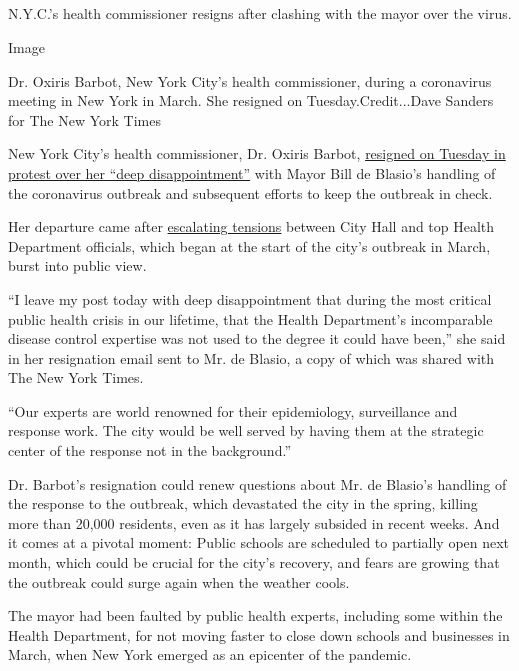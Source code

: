 \hypertarget{-1}{%
\subsection{}\label{-1}}

N.Y.C.'s health commissioner resigns after clashing with the mayor over
the virus.

Image

Dr. Oxiris Barbot, New York City's health commissioner, during a
coronavirus meeting in New York in March. She resigned on
Tuesday.Credit...Dave Sanders for The New York Times

New York City's health commissioner, Dr. Oxiris Barbot,
\href{https://www.nytimes3xbfgragh.onion/2020/08/04/nyregion/oxiris-barbot-health-commissioner-resigns.html}{resigned
on Tuesday in protest over her ``deep disappointment''} with Mayor Bill
de Blasio's handling of the coronavirus outbreak and subsequent efforts
to keep the outbreak in check.

Her departure came after
\href{https://www.nytimes3xbfgragh.onion/2020/05/14/nyregion/coronavirus-de-blasio-mitchell-katz.html}{escalating
tensions} between City Hall and top Health Department officials, which
began at the start of the city's outbreak in March, burst into public
view.

``I leave my post today with deep disappointment that during the most
critical public health crisis in our lifetime, that the Health
Department's incomparable disease control expertise was not used to the
degree it could have been,'' she said in her resignation email sent to
Mr. de Blasio, a copy of which was shared with The New York Times.

``Our experts are world renowned for their epidemiology, surveillance
and response work. The city would be well served by having them at the
strategic center of the response not in the background.''

Dr. Barbot's resignation could renew questions about Mr. de Blasio's
handling of the response to the outbreak, which devastated the city in
the spring, killing more than 20,000 residents, even as it has largely
subsided in recent weeks. And it comes at a pivotal moment: Public
schools are scheduled to partially open next month, which could be
crucial for the city's recovery, and fears are growing that the outbreak
could surge again when the weather cools.

The mayor had been faulted by public health experts, including some
within the Health Department, for not moving faster to close down
schools and businesses in March, when New York emerged as an epicenter
of the pandemic.

